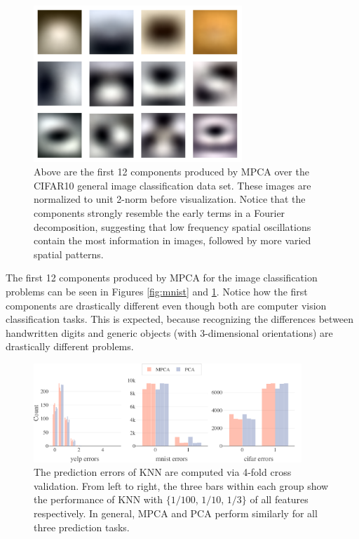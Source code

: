 \documentclass{scspaperproc}
\theoremstyle{scsthe}
\begin{document}
\begin{figure}
  \centering
  \includegraphics[width=0.7\textwidth]{2-mpca-CIFAR10-components.png}
  \caption{Above are the first 12 components produced by MPCA over the
    CIFAR10 general image classification data set. These images are
    normalized to unit 2-norm before visualization. Notice that the
    components strongly resemble the early terms in a Fourier
    decomposition, suggesting that low frequency spatial oscillations
    contain the most information in images, followed by more varied
    spatial patterns.}
  \label{fig:cifar10}
\end{figure}


The first 12 components produced by MPCA for the image classification
problems can be seen in Figures \ref{fig:mnist} and
\ref{fig:cifar10}. Notice how the first components are drastically
different even though both are computer vision classification tasks.
This is expected, because recognizing the differences between
handwritten digits and generic objects (with 3-dimensional
orientations) are drastically different problems.

\begin{figure}
  \centering
  \includegraphics[width=0.9\textwidth]{3-prediction-errors.pdf}
  \caption{The prediction errors of KNN are computed via 4-fold cross
    validation. From left to right, the three bars within each group
    show the performance of KNN with $\{1/100$, $1/10$, $1/3\}$ of all
    features respectively. In general, MPCA and PCA perform similarly
    for all three prediction tasks.}
  \label{fig:errors}
\end{figure}
\end{document}
